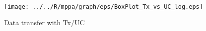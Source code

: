 \documentclass[conference,compsoc]{IEEEtran}
\begin{document}
\begin{figure}[t]
  \centering
  \texttt{[image: ../../R/mppa/graph/eps/BoxPlot\_Tx\_vs\_UC\_log.eps]}
  \vspace{-2mm}
  \caption{\label{fig:tx_uc_log}
    Data transfer with Tx/UC }
  \vspace{-4mm}
\end{figure}

\end{document}
